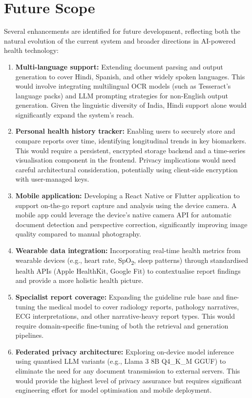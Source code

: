 \documentclass[12pt,a4paper]{report}
\begin{document}
\section{Future Scope}
Several enhancements are identified for future development, reflecting both the natural evolution of the current system and broader directions in AI-powered health technology:

\begin{enumerate}
    \item \textbf{Multi-language support:} Extending document parsing and output generation to cover Hindi, Spanish, and other widely spoken languages. This would involve integrating multilingual OCR models (such as Tesseract's language packs) and LLM prompting strategies for non-English output generation. Given the linguistic diversity of India, Hindi support alone would significantly expand the system's reach.
    \item \textbf{Personal health history tracker:} Enabling users to securely store and compare reports over time, identifying longitudinal trends in key biomarkers. This would require a persistent, encrypted storage backend and a time-series visualisation component in the frontend. Privacy implications would need careful architectural consideration, potentially using client-side encryption with user-managed keys.
    \item \textbf{Mobile application:} Developing a React Native or Flutter application to support on-the-go report capture and analysis using the device camera. A mobile app could leverage the device's native camera API for automatic document detection and perspective correction, significantly improving image quality compared to manual photography.
    \item \textbf{Wearable data integration:} Incorporating real-time health metrics from wearable devices (e.g., heart rate, SpO\textsubscript{2}, sleep patterns) through standardised health APIs (Apple HealthKit, Google Fit) to contextualise report findings and provide a more holistic health picture.
    \item \textbf{Specialist report coverage:} Expanding the guideline rule base and fine-tuning the medical model to cover radiology reports, pathology narratives, ECG interpretations, and other narrative-heavy report types. This would require domain-specific fine-tuning of both the retrieval and generation pipelines.
    \item \textbf{Federated privacy architecture:} Exploring on-device model inference using quantised LLM variants (e.g., Llama 3 8B Q4\_K\_M GGUF) to eliminate the need for any document transmission to external servers. This would provide the highest level of privacy assurance but requires significant engineering effort for model optimisation and mobile deployment.

\end{enumerate}
\end{document}
